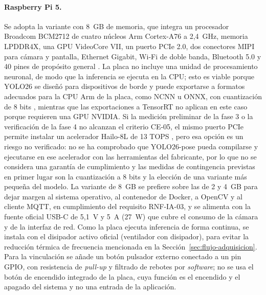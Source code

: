 \documentclass[12pt,a4paper,oneside]{book}
\theoremstyle{plain}
\theoremstyle{definition}
\theoremstyle{remark}
\begin{document}
\paragraph{Raspberry Pi 5.} Se adopta la variante con 8~GB de memoria, que integra un procesador Broadcom BCM2712 de cuatro núcleos Arm Cortex-A76 a 2,4~GHz, memoria LPDDR4X, una GPU VideoCore VII, un puerto PCIe 2.0, dos conectores MIPI para cámara y pantalla, Ethernet Gigabit, Wi-Fi de doble banda, Bluetooth 5.0 y 40 pines de propósito general \parencite{raspberrypi2026pi5}. La placa no incluye una unidad de procesamiento neuronal, de modo que la inferencia se ejecuta en la CPU; esto es viable porque YOLO26 se diseñó para dispositivos de borde y puede exportarse a formatos adecuados para la CPU Arm de la placa, como NCNN \parencite{tencent2026ncnn} u ONNX, con cuantización de 8 bits \parencite{ultralytics2026yolo26,ultralytics2026rpi}, mientras que las exportaciones a TensorRT no aplican en este caso porque requieren una GPU NVIDIA. Si la medición preliminar de la fase 3 o la verificación de la fase 4 no alcanzan el criterio CE-05, el mismo puerto PCIe permite instalar un acelerador Hailo-8L de 13 TOPS \parencite{raspberrypi2026aihat}, pero esa opción es un riesgo no verificado: no se ha comprobado que YOLO26-pose pueda compilarse y ejecutarse en ese acelerador con las herramientas del fabricante, por lo que no se considera una garantía de cumplimiento y las medidas de contingencia previstas en primer lugar son la cuantización a 8 bits y la elección de una variante más pequeña del modelo. La variante de 8~GB se prefiere sobre las de 2 y 4~GB para dejar margen al sistema operativo, al contenedor de Docker, a OpenCV y al cliente MQTT, en cumplimiento del requisito RNF-IA-03, y se alimenta con la fuente oficial USB-C de 5,1~V y 5~A (27~W) que cubre el consumo de la cámara y de la interfaz de red. Como la placa ejecuta inferencia de forma continua, se instala con el disipador activo oficial (ventilador con disipador), para evitar la reducción térmica de frecuencia mencionada en la Sección~\ref{sec:flujo-adquisicion}. Para la vinculación se añade un botón pulsador externo conectado a un pin GPIO, con resistencia de \textit{pull-up} y filtrado de rebotes por \textit{software}; no se usa el botón de encendido integrado de la placa, cuya función es el encendido y el apagado del sistema y no una entrada de la aplicación.
\end{document}
